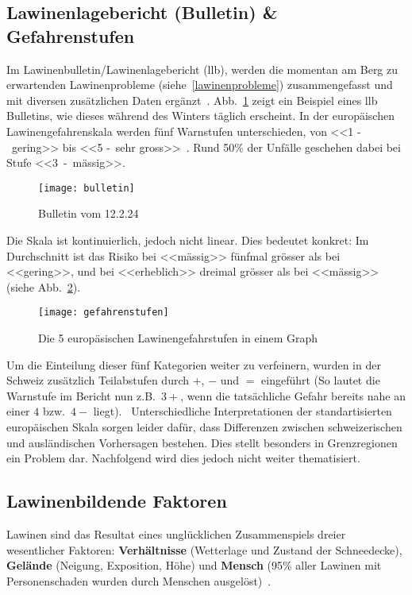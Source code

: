 \subsection{Lawinenlagebericht (Bulletin) \& Gefahrenstufen}

Im Lawinenbulletin/Lawinenlagebericht (\gls{llb}), werden die momentan am Berg zu erwartenden Lawinenprobleme (siehe~\ref{lawinenprobleme}) zusammengefasst und mit diversen zusätzlichen Daten ergänzt~\cite{lawinengefskala}.
Abb.\ \ref{fig:bulletin} zeigt ein Beispiel eines \gls{llb} Bulletins, wie dieses während des Winters täglich erscheint.
In der europäischen Lawinengefahrenskala werden fünf Warnstufen unterschieden, von <<1 -~gering>> bis <<5 -~sehr gross>>~\cite{harveyrhynerschweizerlawinenkunde}\cite{lawinengefskala}.
Rund 50\% der Unfälle geschehen dabei bei Stufe <<3~-~mässig>>.~\cite{achtunglawine}
\begin{figure}[H]
  \centering
  \texttt{[image: bulletin]}
  \caption{Bulletin vom 12.2.24~\cite{slfarchiv}}\label{fig:bulletin}
\end{figure}
Die Skala ist kontinuierlich, jedoch nicht linear. Dies bedeutet konkret: 
Im Durchschnitt ist das Risiko bei <<mässig>> fünfmal grösser als bei <<gering>>, und bei <<erheblich>> dreimal grösser als bei <<mässig>>~\cite{sacbergspwinter} (siehe Abb.\ \ref{fig:llbdanger}).
\begin{figure}[H]
  \centering
  \texttt{[image: gefahrenstufen]}
  \caption{Die 5 europäsischen Lawinengefahrstufen in einem Graph}\label{fig:llbdanger}
\end{figure}
Um die Einteilung dieser fünf Kategorien weiter zu verfeinern, wurden in der Schweiz zusätzlich Teilabstufen durch $+$, $-$ und $=$ eingeführt (So lautet die Warnstufe im Bericht nun z.B.\ $3+$, wenn die tatsächliche Gefahr bereits nahe an einer $4$ bzw.\ $4-$ liegt).~\cite{sacbergspwinter}
Unterschiedliche Interpretationen der standartisierten europäischen Skala sorgen leider dafür, dass Differenzen zwischen schweizerischen und ausländischen Vorhersagen bestehen. Dies stellt besonders in Grenzregionen ein Problem dar. Nachfolgend wird dies jedoch nicht weiter thematisiert.

\pagebreak
\subsection{Lawinenbildende Faktoren}

Lawinen sind das Resultat eines unglücklichen Zusammenspiels dreier wesentlicher Faktoren: 
\textbf{Verhältnisse} (Wetterlage und Zustand der Schneedecke), \textbf{Gelände} (Neigung, Exposition, Höhe) und \textbf{Mensch} (95\% aller Lawinen mit Personenschaden wurden durch Menschen ausgelöst)~\cite{ortovoxlabsnow}.

